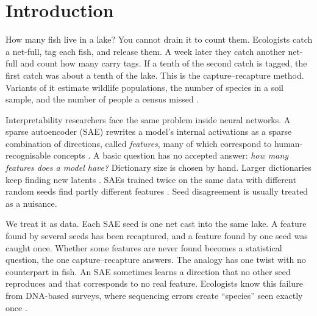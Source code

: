 \section{Introduction}
\label{sec:intro}

How many fish live in a lake? You cannot drain it to count them. Ecologists catch a net-full, tag each fish, and release them. A week later they catch another net-full and count how many carry tags. If a tenth of the second catch is tagged, the first catch was about a tenth of the lake. This is the capture--recapture method. Variants of it estimate wildlife populations, the number of species in a soil sample, and the number of people a census missed \citep{chao1987estimating,fienberg1972multiple,colwell2012models}.

Interpretability researchers face the same problem inside neural networks. A sparse autoencoder (SAE) rewrites a model's internal activations as a sparse combination of directions, called \emph{features}, many of which correspond to human-recognisable concepts \citep{cunningham2023sparse,bricken2023monosemanticity,templeton2024scaling}. A basic question has no accepted answer: \emph{how many features does a model have?} Dictionary size is chosen by hand. Larger dictionaries keep finding new latents \citep{gao2024scaling}. SAEs trained twice on the same data with different random seeds find partly different features \citep{paulo2025sparse}. Seed disagreement is usually treated as a nuisance.

We treat it as data. Each SAE seed is one net cast into the same lake. A feature found by several seeds has been recaptured, and a feature found by one seed was caught once. Whether some features are never found becomes a statistical question, the one capture--recapture answers. The analogy has one twist with no counterpart in fish. An SAE sometimes learns a direction that no other seed reproduces and that corresponds to no real feature. Ecologists know this failure from DNA-based surveys, where sequencing errors create ``species'' seen exactly once \citep{chiu2016estimating}.


